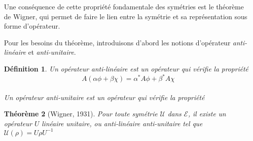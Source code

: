 \documentclass[11pt,twoside,a4paper]{report}
\numberwithin{equation}{part}
\newtheorem{theorem}{Théorème}[section]
\newtheorem{definition}[theorem]{Définition}
\begin{document}
Une conséquence de cette propriété fondamentale des symétries est le théorème de Wigner, qui permet de faire le lien entre la symétrie et sa représentation sous forme d'opérateur.

Pour les besoins du théorème, introduisons d'abord les notions d'opérateur \emph{anti-linéaire} et \emph{anti-unitaire}.

\begin{definition}
  Un opérateur \emph{anti-linéaire} est un opérateur qui vérifie la propriété
  $$ A(\alpha\phi + \beta\chi) = \alpha^* A\phi + \beta^* A\chi $$ \\
  Un opérateur \emph{anti-unitaire} est un opérateur qui vérifie la propriété
\end{definition}

\begin{theorem}[Wigner, 1931]
Pour toute symétrie $\mathcal{U}$ dans $\mathcal{E}$, il existe un opérateur $U$ linéaire unitaire, ou anti-linéaire anti-unitaire tel que $\mathcal{U}(\rho) = U\rho U^{-1}$
\end{theorem}
\end{document}
